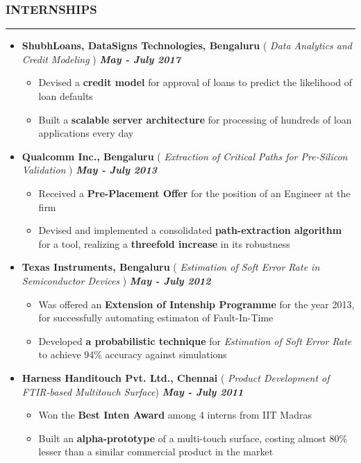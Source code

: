 \documentclass[10pt,a4paper,English]{article}
\newcommand\roottitle[1]{\vspace{-4mm}\subsubsection*{\uppercase{#1}}\vspace{-0.3em}\nopagebreak[4]\hrule\vspace{4mm}}
\newcommand\itemyear[1]{\hfill \textbf{\emph{\color{itemyear} #1}}}
\newcommand\itemenv{\setlength\itemsep{0.5pt} \addtolength{\itemindent}{-5mm}\vspace{-1.5mm}}
\begin{document}
\roottitle{INTERNSHIPS}
\begin{itemize} \itemenv
    \item \textbf{ ShubhLoans, DataSigns Technologies, Bengaluru } \hfill({\emph{ Data Analytics and Credit Modeling }}) \itemyear{May - July 2017}
        \begin{itemize} \itemenv
            \item Devised a \textbf{credit model} for approval of loans to predict the likelihood of loan defaults
            \item Built a \textbf{scalable server architecture} for processing of hundreds of loan applications every day
        \end{itemize}
    \item \textbf{ Qualcomm Inc., Bengaluru } \hfill({\emph{ Extraction of Critical Paths for Pre-Silicon Validation }}) \itemyear{May - July 2013}
        \begin{itemize} \itemenv
            \item Received a \textbf{Pre-Placement Offer} for the position of an Engineer at the firm
            \item Devised and implemented a consolidated \textbf{path-extraction algorithm} for a tool, realizing a \textbf{threefold increase} in its robustness
        \end{itemize}
    \item \textbf{ Texas Instruments, Bengaluru } \hfill({\emph{ Estimation of Soft Error Rate in Semiconductor Devices }}) \itemyear{May - July 2012}
        \begin{itemize} \itemenv
            \item Was offered an \textbf{Extension of Intenship Programme} for the year 2013, for successfully automating estimaton of Fault-In-Time
            \item Developed \textbf{a probabilistic technique} for \emph{Estimation of Soft Error Rate} to achieve 94\% accuracy against simulations
        \end{itemize}
    \item \textbf{ Harness Handitouch Pvt. Ltd., Chennai } \hfill({\emph{ Product Development of FTIR-based Multitouch Surface}}) \itemyear{May - July 2011}
        \begin{itemize} \itemenv
            \item Won the \textbf{Best Inten Award} among 4 interns from IIT Madras
            \item Built an \textbf{alpha-prototype} of a multi-touch surface, costing almost 80\% lesser than a similar commercial product in the market
        \end{itemize}
  \end{itemize}
\end{document}
